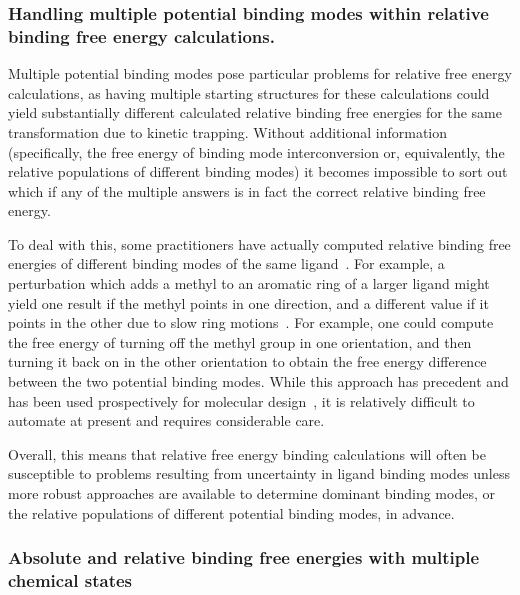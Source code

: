 \documentclass[9pt,bestpractices]{livecoms}
\begin{document}
\subsubsection{Handling multiple potential binding modes within relative binding free energy calculations.}
Multiple potential binding modes pose particular problems for relative free energy calculations, as having multiple starting structures for these calculations could yield substantially different calculated relative binding free energies for the same transformation due to kinetic trapping. Without additional information (specifically, the free energy of binding mode interconversion or, equivalently, the relative populations of different binding modes) it becomes impossible to sort out which if any of the multiple answers is in fact the correct relative binding free energy.

To deal with this, some practitioners have actually computed relative binding free energies of different binding modes of the same ligand~\cite{palma2012computation}.
For example, a perturbation which adds a methyl to an aromatic ring of a larger ligand might yield one result if the methyl points in one direction, and a different value if it points in the other due to slow ring motions~\cite{lincoff2016comparing, sasmal2020sampling}.
For example, one could compute the free energy of turning off the methyl group in one orientation, and then turning it back on in the other orientation to obtain the free energy difference between the two potential binding modes.
While this approach has precedent and has been used prospectively for molecular design~\cite{desimone2019}, it is relatively difficult to automate at present and requires considerable care.

Overall, this means that relative free energy binding calculations will often be susceptible to problems resulting from uncertainty in ligand binding modes unless more robust approaches are available to determine dominant binding modes, or the relative populations of different potential binding modes, in advance.

\subsubsection{Absolute and relative binding free energies with multiple chemical states}
\label{sec:multiple-chemical-states}
\end{document}
